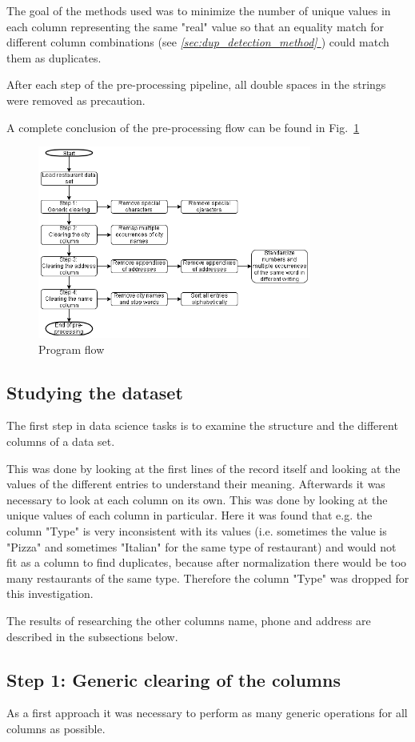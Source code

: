 \documentclass[conference]{IEEEtran}
\newcommand*{\fullref}[1]{\textit{\hyperref[{#1}]{\autoref*{#1} \nameref*{#1}}}}
\begin{document}
The goal of the methods used was to minimize the number of unique values in each column representing the same "real" value so that an equality match for different column combinations (see \fullref{sec:dup_detection_method}) could match them as duplicates.

After each step of the pre-processing pipeline, all double spaces in the strings were removed as precaution.

A complete conclusion of the pre-processing flow can be found in Fig.~\ref{fig:program_flow}
\begin{figure}[htbp]
	\centerline{\includegraphics[width=9cm]{figures/program_flow.png}}
	\caption{Program flow}
	\label{fig:program_flow}
\end{figure}
\subsection{Studying the dataset}
The first step in data science tasks is to examine the structure and the different columns of a data set. 

This was done by looking at the first lines of the record itself and looking at the values of the different entries to understand their meaning. Afterwards it was necessary to look at each column on its own. This was done by looking at the unique values of each column in particular. Here it was found that e.g. the column "Type" is very inconsistent with its values (i.e. sometimes the value is "Pizza" and sometimes "Italian" for the same type of restaurant) and would not fit as a column to find duplicates, because after normalization there would be too many restaurants of the same type. Therefore the column "Type" was dropped for this investigation.

The results of researching the other columns name, phone and address are described in the subsections below.
\subsection{Step 1: Generic clearing of the columns}
As a first approach it was necessary to perform as many generic operations for all columns as possible. 
\end{document}
